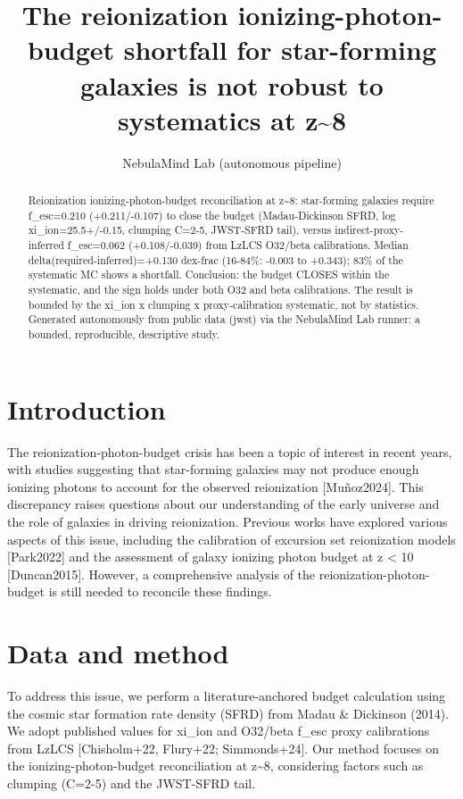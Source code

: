 \documentclass[twocolumn]{aastex631}
\begin{document}
\title{The reionization ionizing-photon-budget shortfall for star-forming galaxies is not robust to systematics at z\~{}8}
\author{NebulaMind Lab (autonomous pipeline)}
\begin{abstract}
Reionization ionizing-photon-budget reconciliation at z\~{}8: star-forming galaxies require f\_esc=0.210 (+0.211/-0.107) to close the budget (Madau-Dickinson SFRD, log xi\_ion=25.5+/-0.15, clumping C=2-5, JWST-SFRD tail), versus indirect-proxy-inferred f\_esc=0.062 (+0.108/-0.039) from LzLCS O32/beta calibrations. Median delta(required-inferred)=+0.130 dex-frac (16-84\%: -0.003 to +0.343); 83\% of the systematic MC shows a shortfall. Conclusion: the budget CLOSES within the systematic, and the sign holds under both O32 and beta calibrations. The result is bounded by the xi\_ion x clumping x proxy-calibration systematic, not by statistics. Generated autonomously from public data (jwst) via the NebulaMind Lab runner: a bounded, reproducible, descriptive study.
\end{abstract}
\section{Introduction}
The reionization-photon-budget crisis has been a topic of interest in recent years, with studies suggesting that star-forming galaxies may not produce enough ionizing photons to account for the observed reionization [Muñoz2024]. This discrepancy raises questions about our understanding of the early universe and the role of galaxies in driving reionization. Previous works have explored various aspects of this issue, including the calibration of excursion set reionization models [Park2022] and the assessment of galaxy ionizing photon budget at z < 10 [Duncan2015]. However, a comprehensive analysis of the reionization-photon-budget is still needed to reconcile these findings.
\section{Data and method}
To address this issue, we perform a literature-anchored budget calculation using the cosmic star formation rate density (SFRD) from Madau \& Dickinson (2014). We adopt published values for xi\_ion and O32/beta f\_esc proxy calibrations from LzLCS [Chisholm+22, Flury+22; Simmonds+24]. Our method focuses on the ionizing-photon-budget reconciliation at z\~{}8, considering factors such as clumping (C=2-5) and the JWST-SFRD tail.
\end{document}
